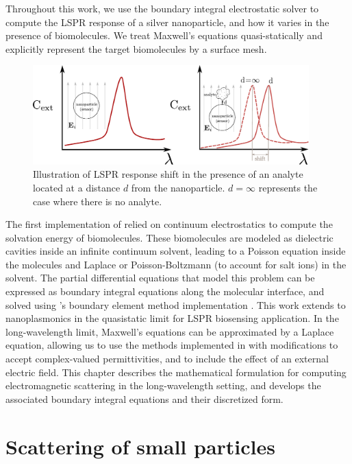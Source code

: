 Throughout this work, we use the boundary integral electrostatic solver \pygbe \cite{ClementiETal2017} to compute 
the LSPR response of a silver nanoparticle, and how it varies in the presence of biomolecules. We treat Maxwell's equations
quasi-statically \cite{MayergoyzZhang2007} and explicitly represent the target biomolecules by a surface mesh.

\begin{figure}
   \centering
     \includegraphics[width=0.95\textwidth]{lspr_biosensing.pdf} 
     \caption{Illustration of LSPR response shift in the presence of an analyte located at a distance $d$
     from the nanoparticle. $d=\infty$ represents the case where there is no analyte.}
     \label{fig:lspr_bio}
\end{figure}


The first implementation of \pygbe relied on continuum electrostatics to compute the solvation energy
of biomolecules. These biomolecules are modeled as dielectric cavities inside an infinite continuum 
solvent, leading to a Poisson equation inside the molecules and Laplace or Poisson-Boltzmann
(to account for salt ions) in the solvent. The partial differential equations that model this problem
can be expressed as boundary integral equations along the molecular interface, and solved using 
\pygbe's boundary element method implementation \cite{CooperBardhanBarba2013,CooperClementiBarba2015}.
This work extends \pygbe to nanoplasmonics in the quasistatic limit for LSPR biosensing application. In the long-wavelength limit,
Maxwell's equations can be approximated by a Laplace equation, allowing us to use the methods implemented in \pygbe with modifications
to accept complex-valued permittivities, and to include the effect of an external electric field. This chapter describes the mathematical
formulation for computing electromagnetic scattering in the long-wavelength setting, and develops the associated boundary 
integral equations and their discretized form.

\section{Scattering of small particles} \label{sec:scattering_small}

